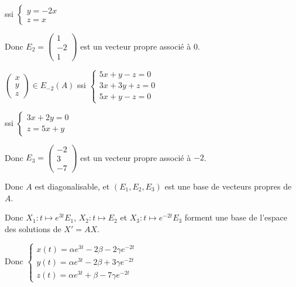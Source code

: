 \begin{exemple}
    ssi $\begin{cases}
        y = -2x \\
        z = x 
    \end{cases}$

    Donc $E_2 = \begin{pmatrix}
    1 \\ -2 \\ 1
    \end{pmatrix}$ est un vecteur propre associé à $0$.

    $\begin{pmatrix}
        x \\ y \\ z
        \end{pmatrix} \in E_{-2}(A)$ ssi $\begin{cases}
        5x + y - z = 0 \\
        3x + 3y + z = 0 \\
        5x + y - z = 0
    \end{cases}$

    ssi $\begin{cases}
        3x + 2y = 0 \\
        z = 5x + y 
    \end{cases}$

    Donc $E_3 = \begin{pmatrix}
        -2 \\ 3 \\ -7
    \end{pmatrix}$ est un vecteur propre associé à $-2$.

    Donc $A$ est diagonalisable, et $(E_1, E_2, E_3)$ est une base de vecteurs propres de $A$.

    Donc $X_1 : t \mapsto e^{3t} E_1$, $X_2 : t \mapsto E_2$ et $X_3 : t \mapsto e^{-2t} E_3$ forment une base de l'espace des solutions de $X' = AX$.

    Donc $\begin{cases}
        x(t) = \alpha e^{3t} - 2 \beta - 2 \gamma e^{-2t} \\
        y(t) = \alpha e^{3t} - 2 \beta + 3 \gamma e^{-2t} \\
        z(t) = \alpha e^{3t} + \beta - 7 \gamma e^{-2t}
    \end{cases}$
\end{exemple}


